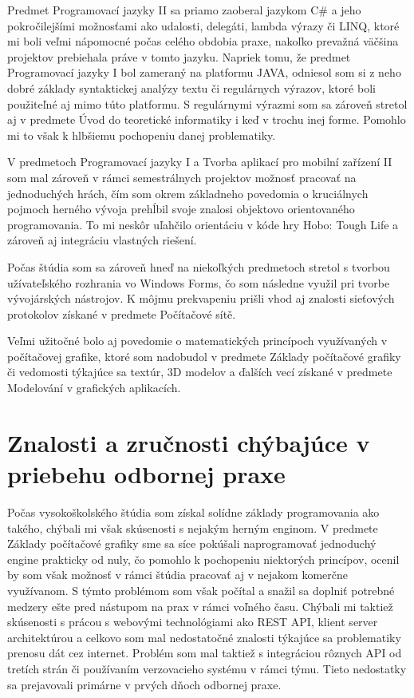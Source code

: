 \documentclass[slovak, bachelorpractice]{diploma}
\begin{document}
Predmet Programovací jazyky II sa priamo zaoberal jazykom C\# a jeho pokročilejšími možnosťami ako udalosti, delegáti, lambda výrazy či LINQ, ktoré mi boli veľmi nápomocné počas celého obdobia praxe, nakoľko prevažná väčšina projektov prebiehala práve v tomto jazyku. Napriek tomu, že predmet Programovací jazyky I bol zameraný na platformu JAVA, odniesol som si z neho dobré základy syntaktickej analýzy textu či regulárnych výrazov, ktoré boli použiteľné aj mimo túto platformu. S regulárnymi výrazmi som sa zároveň stretol aj v predmete Úvod do teoretické informatiky i keď v trochu inej forme. Pomohlo mi to však k hlbšiemu pochopeniu danej problematiky. 

V predmetoch Programovací jazyky I a Tvorba aplikací pro mobilní zařízení II som mal zároveň v rámci semestrálnych projektov možnosť pracovať na jednoduchých hrách, čím som okrem základneho povedomia o kruciálnych pojmoch herného vývoja prehĺbil svoje znalosi objektovo orientovaného programovania. To mi neskôr uľahčilo orientáciu v kóde hry Hobo: Tough Life a zároveň aj integráciu vlastných riešení.

Počas štúdia som sa zároveň hneď na niekoľkých predmetoch stretol s tvorbou užívateľského rozhrania vo Windows Forms, čo som následne využil pri tvorbe vývojárských nástrojov. K môjmu prekvapeniu prišli vhod aj znalosti sieťových protokolov získané v predmete Počítačové sítě.

Veľmi užitočné bolo aj povedomie o matematických princípoch využívaných v počítačovej grafike, ktoré som nadobudol v predmete Základy počítačové grafiky či vedomosti týkajúce sa textúr, 3D modelov a ďalších vecí získané v predmete Modelování v grafických aplikacích.

\label{sec:techZruc}
\section{Znalosti a zručnosti chýbajúce v priebehu odbornej praxe}
\label{sec:coNeviem}
Počas vysokoškolského štúdia som získal solídne základy programovania ako takého, chýbali mi však skúsenosti s nejakým herným enginom. V predmete Základy počítačové grafiky sme sa síce pokúšali naprogramovať jednoduchý engine prakticky od nuly, čo pomohlo k pochopeniu niektorých princípov, ocenil by som však možnosť v rámci štúdia pracovať aj v nejakom komerčne využívanom. S týmto problémom som však počítal a snažil sa doplniť potrebné medzery ešte pred nástupom na prax v rámci voľného času. Chýbali mi taktiež skúsenosti s prácou s webovými technológiami ako REST API, klient server architektúrou a celkovo som mal nedostatočné znalosti týkajúce sa problematiky prenosu dát cez internet. Problém som mal taktiež s integráciou rôznych API od tretích strán či používaním verzovacieho systému v rámci týmu. Tieto nedostatky sa prejavovali primárne v prvých dňoch odbornej praxe.
\end{document}
